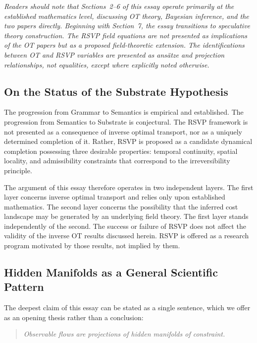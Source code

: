 \documentclass[12pt]{article}
\begin{document}
\textit{Readers should note that Sections~2--6 of this essay operate primarily at the established mathematics level, discussing OT theory, Bayesian inference, and the two papers directly. Beginning with Section~7, the essay transitions to speculative theory construction. The RSVP field equations are not presented as implications of the OT papers but as a proposed field-theoretic extension. The identifications between OT and RSVP variables are presented as ansätze and projection relationships, not equalities, except where explicitly noted otherwise.}

\subsection{On the Status of the Substrate Hypothesis}

The progression from Grammar to Semantics is empirical and established. The progression from Semantics to Substrate is conjectural. The RSVP framework is not presented as a consequence of inverse optimal transport, nor as a uniquely determined completion of it. Rather, RSVP is proposed as a candidate dynamical completion possessing three desirable properties: temporal continuity, spatial locality, and admissibility constraints that correspond to the irreversibility principle.

The argument of this essay therefore operates in two independent layers. The first layer concerns inverse optimal transport and relies only upon established mathematics. The second layer concerns the possibility that the inferred cost landscape may be generated by an underlying field theory. The first layer stands independently of the second. The success or failure of RSVP does not affect the validity of the inverse OT results discussed herein. RSVP is offered as a research program motivated by those results, not implied by them.

\subsection{Hidden Manifolds as a General Scientific Pattern}

The deepest claim of this essay can be stated as a single sentence, which we offer as an opening thesis rather than a conclusion:

\begin{quote}
\itshape Observable flows are projections of hidden manifolds of constraint.
\end{quote}
\end{document}
